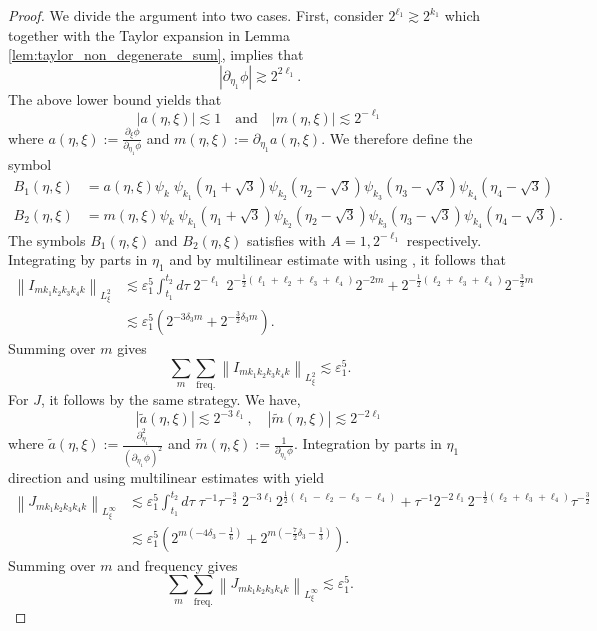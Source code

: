 \documentclass[reqno,english,11pt]{amsart}
\newcommand{\eps}{\varepsilon}
\newcommand{\snorm}[1]{\left\|#1\right\|}
\theoremstyle{definition}
\numberwithin{equation}{section}
\begin{document}
\begin{proof}
	We divide the argument into two cases.
	First, consider $2^{\ell_1}\gtrsim 2^{k_1}$ which together with the Taylor expansion in Lemma \ref{lem:taylor_non_degenerate_sum}, implies that 
	$$|\partial_{\eta_1}\phi|\gtrsim 2^{2\ell_1}.$$
	The above lower bound yields that
	$$|a(\eta,\xi)|\lesssim 1 \quad \text{and}\quad |m(\eta,\xi)|\lesssim 2^{-\ell_1}$$
	where $a(\eta,\xi):=\frac{\partial_\xi \phi}{\partial_{\eta_1}\phi}$ and $m(\eta,\xi):=\partial_{\eta_1}a(\eta,\xi)$. We therefore define the symbol
	\begin{align*}
	B_1(\eta,\xi)&=a(\eta,\xi)\psi_k\; \psi_{k_1}(\eta_1+\sqrt{3}) \psi_{k_2}(\eta_2-\sqrt{3}) \psi_{k_3}(\eta_3-\sqrt{3}) \psi_{k_4}(\eta_4-\sqrt{3})\\
	B_2(\eta,\xi)&=m(\eta,\xi)\psi_k\; \psi_{k_1}(\eta_1+\sqrt{3}) \psi_{k_2}(\eta_2-\sqrt{3}) \psi_{k_3}(\eta_3-\sqrt{3}) \psi_{k_4}(\eta_4-\sqrt{3}).
	\end{align*}
	 The symbols $B_1(\eta,\xi)$ and $B_2(\eta,\xi)$ satisfies \cite[Lemma B.3]{Morgan} with $A=1, 2^{-\ell_1}$ respectively.  Integrating by parts in $\eta_1$ and by multilinear estimate with using \cite[Proposition B.1]{Morgan}, it follows that
	   \begin{align*}
	       \snorm{I_{mk_1k_2k_3k_4k}}_{L^2_\xi}&\lesssim \eps_1^5\int^{t_2}_{t_1} d\tau\;2^{-\ell_1}\; 2^{-\frac{1}{2}(\ell_1+\ell_2+\ell_3+\ell_4)}2^{-2m}+2^{-\frac{1}{2}(\ell_2+\ell_3+\ell_4)}2^{-\frac{3}{2}m}\\
           &\lesssim \eps_1^5 \left(2^{-3\delta_3m}+2^{-\frac{3}{2}\delta_3 m}\right).
	   \end{align*}
     Summing over $m$ gives
     $$\sum_m\sum_{\operatorname{freq.}}\snorm{I_{mk_1k_2k_3k_4k}}_{L^2_\xi}\lesssim \eps_1^5. $$
     For $J$, it follows by the same strategy. We have,
     $$|\tilde{a}(\eta,\xi)|\lesssim 2^{-3\ell_1},\quad |\tilde{m}(\eta,\xi)|\lesssim 2^{-2\ell_1}$$
     where $\tilde{a}(\eta,\xi):=\frac{\partial^2_{\eta_1}}{(\partial_{\eta_1}\phi)^2}$ and $\tilde{m}(\eta,\xi):=\frac{1}{\partial_{\eta_1}\phi}$. Integration by parts in $\eta_1$ direction and using multilinear estimates with \cite[Proposition B.6]{Morgan} yield 
     \begin{align*}
         \snorm{J_{mk_1k_2k_3k_4k}}_{L^\infty_\xi}&\lesssim \eps_1^5\int^{t_2}_{t_1} d\tau\;\tau^{-1} \tau^{-\frac{3}{2}}\;2^{-3\ell_1}2^{\frac{1}{2}(\ell_1-\ell_2-\ell_3-\ell_4)}+\tau^{-1}2^{-2\ell_1}2^{-\frac{1}{2}(\ell_2+\ell_3+\ell_4)}\tau^{-\frac{3}{2}}\\
         &\lesssim \eps_1^5\left(2^{m(-4\delta_3-\frac{1}{6})}+2^{m(-\frac{7}{2}\delta_3-\frac{1}{3})}\right).
     \end{align*}
     Summing over $m$ and frequency gives
     $$\sum_m\sum_{\operatorname{freq.}}\snorm{J_{mk_1k_2k_3k_4k}}_{L^\infty_\xi}\lesssim \eps_1^5. $$


\end{proof}
\end{document}
